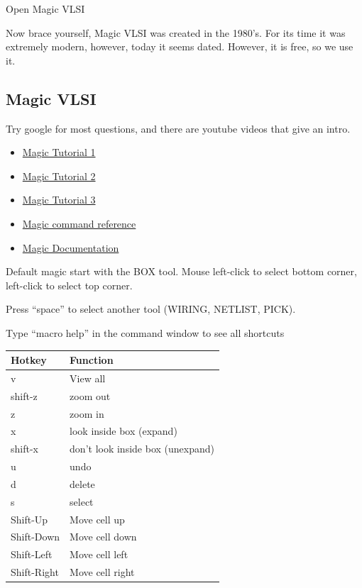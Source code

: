 Open Magic VLSI

\begin{Shaded}
\begin{Highlighting}[]
\end{Highlighting}
\end{Shaded}

Now brace yourself, Magic VLSI was created in the 1980's. For its time
it was extremely modern, however, today it seems dated. However, it is
free, so we use it.

\subsection{Magic VLSI}\label{magic-vlsi}

Try google for most questions, and there are youtube videos that give an
intro.

\begin{itemize}
\tightlist
\item
  \href{https://www.youtube.com/watch?v=ORw5OaY33A4&t=9s}{Magic Tutorial
  1}
\item
  \href{https://www.youtube.com/watch?v=NUahmUtY814}{Magic Tutorial 2}
\item
  \href{https://www.youtube.com/watch?v=OKWM1D0_fPI}{Magic Tutorial 3}
\item
  \href{http://opencircuitdesign.com/magic/commandref/commands.html}{Magic
  command reference}
\item
  \href{https://analogicus.com/magic/}{Magic Documentation}
\end{itemize}

Default magic start with the BOX tool. Mouse left-click to select bottom
corner, left-click to select top corner.

Press ``space'' to select another tool (WIRING, NETLIST, PICK).

Type ``macro help'' in the command window to see all shortcuts

\begin{longtable}[]{@{}ll@{}}
\toprule\noalign{}
Hotkey & Function \\
\midrule\noalign{}
\endhead
\bottomrule\noalign{}
\endlastfoot
v & View all \\
shift-z & zoom out \\
z & zoom in \\
x & look inside box (expand) \\
shift-x & don't look inside box (unexpand) \\
u & undo \\
d & delete \\
s & select \\
Shift-Up & Move cell up \\
Shift-Down & Move cell down \\
Shift-Left & Move cell left \\
Shift-Right & Move cell right \\
\end{longtable}

